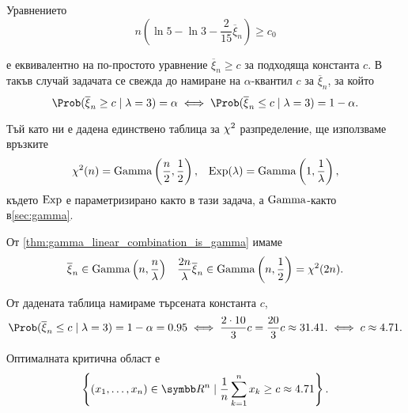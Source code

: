 \documentclass[
  headings=standardclasses,
  bibliography=totocnumbered,
]{scrartcl}
\begin{document}
\begin{solution}
\begin{enumerate}[label=\alph*)]
    Уравнението
    \begin{equation*}
      n \left(\ln 5 - \ln 3 - \frac 2 {15} \overline \xi_n \right) \geq c_0
    \end{equation*}

    е еквивалентно на по-простото уравнение \( \overline \xi_n \geq c \) за подходяща константа \( c \). В такъв случай задачата се свежда до намиране на \( \alpha \)-квантил \( c \) за \( \overline \xi_n \), за който
    \begin{equation*}
      \Prob(\overline \xi_n \geq c \mid \lambda = 3) = \alpha
      \iff
      \Prob(\overline \xi_n \leq c \mid \lambda = 3) = 1 - \alpha.
    \end{equation*}

    Тъй като ни е дадена единствено таблица за \( \chi^2 \) разпределение, ще използваме връзките
    \begin{align*}
      \chi^2(n) = \operatorname{Gamma} \left(\frac n 2, \frac 1 2 \right),
      &&
      \operatorname{Exp}(\lambda) = \operatorname{Gamma}\left(1, \frac 1 \lambda \right),
    \end{align*}
    където \( \operatorname{Exp} \) е параметризирано както в тази задача, а \( \operatorname{Gamma} \)-както в\cref{sec:gamma}.

    От \cref{thm:gamma_linear_combination_is_gamma} имаме
    \begin{align*}
      \overline \xi_n \in \operatorname{Gamma}\left( n, \frac n \lambda \right)
      &&
      \frac {2n} \lambda \overline \xi_n \in \operatorname{Gamma}\left( n, \frac 1 2 \right) = \chi^2(2n).
    \end{align*}

    От дадената таблица намираме търсената константа \( c \),
    \begin{equation*}
      \Prob(\overline \xi_n \leq c \mid \lambda = 3) = 1 - \alpha = 0.95
      \iff
      \frac {2 \cdot 10} 3 c = \frac {20} 3 c \approx 31.41.
      \iff
      c \approx 4.71.
    \end{equation*}

    Оптималната критична област е
    \begin{equation*}
      \left \{ (x_1, \ldots, x_n) \in \R^n \mid \frac 1 n \sum_{k=1}^n x_k \geq c \approx 4.71 \right \}.
    \end{equation*}
  \end{enumerate}
\end{solution}
\end{document}
